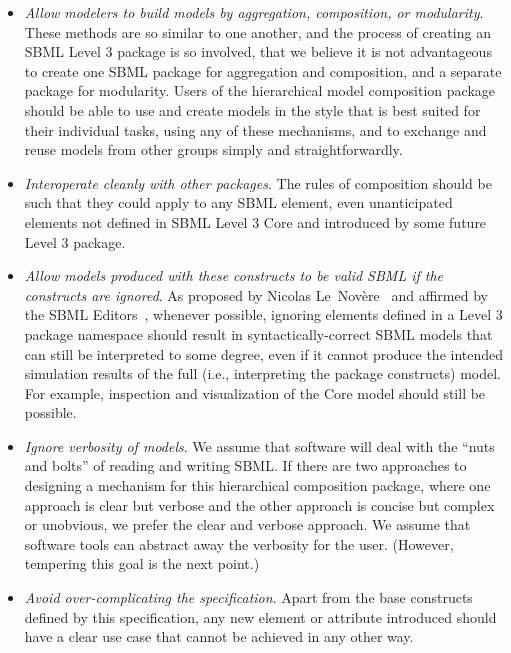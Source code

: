 \begin{itemize}

\item \emph{Allow modelers to build models by aggregation, composition,
    or modularity}.  These methods are so similar to one another, and the
  process of creating an SBML Level 3 package is so involved, that we
  believe it is not advantageous to create one SBML package for
  aggregation and composition, and a separate package for modularity.
  Users of the hierarchical model composition package should be able to
  use and create models in the style that is best suited for their
  individual tasks, using any of these mechanisms, and to exchange and
  reuse models from other groups simply and straightforwardly.

\item \emph{Interoperate cleanly with other packages}. The rules of
  composition should be such that they could apply to any SBML element,
  even unanticipated elements not defined in SBML Level 3 Core and
  introduced by some future Level 3 package.

\item \emph{Allow models produced with these constructs to be valid SBML
    if the constructs are ignored}.  As proposed by Nicolas
  Le~Nov\`{e}re~\citep{lenov:2003} and affirmed by the SBML
  Editors~\citep{editors:2010}, whenever possible, ignoring elements
  defined in a Level 3 package namespace should result in
  syntactically-correct SBML models that can still be interpreted to
  some degree, even if it cannot produce the intended simulation results
  of the full (i.e., interpreting the package constructs) model.  For
  example, inspection and visualization of the Core model should still
  be possible.

\item \emph{Ignore verbosity of models}. We assume that software will
  deal with the ``nuts and bolts'' of reading and writing SBML.  If
  there are two approaches to designing a mechanism for this
  hierarchical composition package, where one approach is clear but
  verbose and the other approach is concise but complex or unobvious, we
  prefer the clear and verbose approach.  We assume that software tools
  can abstract away the verbosity for the user.  (However, tempering
  this goal is the next point.)

\item \emph{Avoid over-complicating the specification}. Apart from the
  base constructs defined by this specification, any new element or
  attribute introduced should have a clear use case that cannot be
  achieved in any other way.


\end{itemize}
